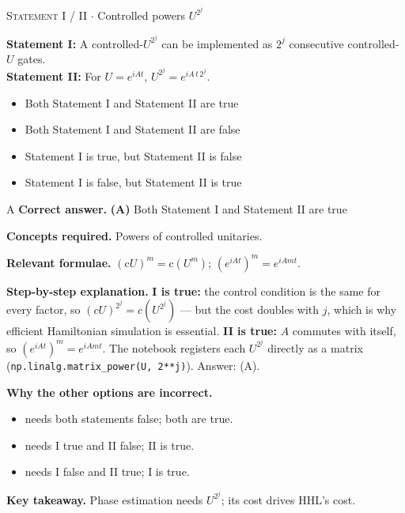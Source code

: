 \documentclass[11pt,a4paper]{article}
\newcommand{\optlabel}[1]{\textbf{(#1)}}
\newcommand{\correctlabel}[1]{\textcolor{okgreen}{\textbf{(#1)}\,\ding{51}}}
\newenvironment{qitem}[1]{\begin{list}{}{\setlength{\leftmargin}{3.3em}\setlength{\labelwidth}{3.1em}%
  \setlength{\labelsep}{0.2em}\setlength{\topsep}{3pt}\setlength{\parsep}{3pt}}\item[\textbf{Q.#1}\hfill]}{\end{list}}
\newcommand{\qsep}{\par\vspace{2pt}{\color{black!15}\hrule}\vspace{4pt}}
\newcommand{\qmeta}[2]{{\footnotesize\color{black!60}\textsc{#1} \;$\cdot$\; #2}\par}
\begin{document}
\begin{qitem}{29}
\qmeta{Statement I / II}{Controlled powers $U^{2^j}$}
\textbf{Statement I:} A controlled-$U^{2^j}$ can be implemented as $2^j$ consecutive controlled-$U$ gates.\\[1mm]
\textbf{Statement II:} For $U = e^{iAt}$, $U^{2^j} = e^{iA\,t\,2^j}$.
\begin{itemize}[leftmargin=2.6em, labelsep=0.4em, itemsep=2pt, topsep=3pt]
\item[\correctlabel{A}] Both Statement I and Statement II are true
\item[\optlabel{B}] Both Statement I and Statement II are false
\item[\optlabel{C}] Statement I is true, but Statement II is false
\item[\optlabel{D}] Statement I is false, but Statement II is true
\end{itemize}
\end{qitem}
\begin{solbox}{A}
\textbf{\color{brand}Correct answer.} \textcolor{okgreen}{\textbf{(A)}} Both Statement I and Statement II are true

\textbf{\color{brand}Concepts required.} Powers of controlled unitaries.

\textbf{\color{brand}Relevant formulae.} $(\mathrm{c}U)^m = \mathrm{c}(U^m)$; $(e^{iAt})^m = e^{iAmt}$.

\textbf{\color{brand}Step-by-step explanation.} \textbf{I is true:} the control condition is the same for every factor, so $(cU)^{2^j} = c(U^{2^j})$ --- but the cost doubles with $j$, which is why efficient Hamiltonian simulation
is essential. \textbf{II is true:} $A$ commutes with itself, so $(e^{iAt})^m = e^{iAmt}$. The notebook registers each $U^{2^j}$ directly as a matrix
(\texttt{np.linalg.matrix\_power(U, 2**j)}). Answer: (A).

\textbf{\color{brand}Why the other options are incorrect.}
\begin{itemize}[leftmargin=2.4em, itemsep=1pt, topsep=2pt]
\item[\textbf{(B)}] needs both statements false; both are true.
\item[\textbf{(C)}] needs I true and II false; II is true.
\item[\textbf{(D)}] needs I false and II true; I is true.
\end{itemize}
\textbf{\color{brand}Key takeaway.} Phase estimation needs $U^{2^j}$; its cost drives HHL's cost.
\end{solbox}
\qsep
\end{document}
